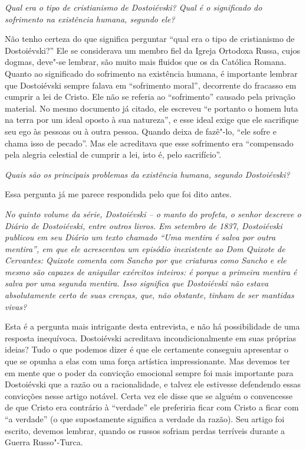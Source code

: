 \medskip

\emph{Qual era o tipo de cristianismo de Dostoiévski? Qual é o significado
do sofrimento na existência humana, segundo ele?}

Não tenho certeza do que significa perguntar ``qual era o tipo de
cristianismo de Dostoiévski?'' Ele se considerava um membro fiel da
Igreja Ortodoxa Russa, cujos dogmas, deve"-se lembrar, são muito mais
fluidos que os da Católica Romana. Quanto ao significado do sofrimento
na existência humana, é importante lembrar que Dostoiévski sempre falava
em ``sofrimento moral'', decorrente do fracasso em cumprir a lei de
Cristo. Ele não se referia ao ``sofrimento'' causado pela privação
material. No mesmo documento já citado, ele escreveu ``e portanto o homem
luta na terra por um ideal oposto à sua natureza'', e esse
ideal exige que ele sacrifique seu ego às pessoas ou à outra pessoa.
Quando deixa de fazê"-lo, ``ele sofre e chama isso de pecado''. Mas ele
acreditava que esse sofrimento era ``compensado pela alegria celestial de
cumprir a lei, isto é, pelo sacrifício''.

\medskip

\emph{Quais são os principais problemas da existência humana, segundo
Dostoiévski?}

Essa pergunta já me parece respondida pelo que foi dito antes.

\medskip

\emph{No quinto volume da série, \emph{Dostoiévski -- o manto do profeta}, o
senhor descreve o \emph{Diário} de Dostoiévski, entre outros livros.
Em setembro de 1837, Dostoiévski publicou em seu \emph{Diário} um texto
chamado ``Uma mentira é salva por outra mentira'', em que ele acrescentou
um episódio inexistente ao \emph{Dom Quixote} de Cervantes: Quixote comenta
com Sancho por que criaturas como Sancho e ele mesmo são capazes de aniquilar exércitos
inteiros: é porque a primeira mentira é salva por uma segunda mentira.
Isso significa que Dostoiévski não estava absolutamente certo de suas
crenças, que, não obstante, tinham de ser mantidas vivas?}

Esta é a pergunta mais intrigante desta entrevista, e não há
possibilidade de uma resposta inequívoca. Dostoiévski acreditava
incondicionalmente em suas próprias ideias? Tudo o que podemos dizer é
que ele certamente conseguiu apresentar o que se opunha a elas com uma
força artística impressionante. Mas devemos ter em mente que o poder da
convicção emocional sempre foi mais importante para Dostoiévski que a
razão ou a racionalidade, e talvez ele estivesse defendendo essas
convicções nesse artigo notável. Certa vez ele disse que se alguém o
convencesse de que Cristo era contrário à ``verdade'' ele preferiria ficar
com Cristo a ficar com ``a verdade'' (o que supostamente significa a
verdade da razão). Seu artigo foi escrito, devemos lembrar, quando os
russos sofriam perdas terríveis durante a Guerra Russo"-Turca.

